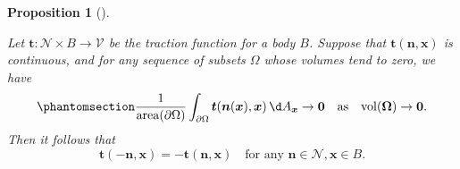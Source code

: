 \documentclass[
  letterpaper,
  DIV=11,
  numbers=noendperiod]{scrreprt}
\theoremstyle{plain}
\newtheorem{proposition}{Proposition}[chapter]
\theoremstyle{remark}
\begin{document}
\begin{proposition}[]\protect\hypertarget{prp-actionreaction}{}\label{prp-actionreaction}

Let \({\boldsymbol{t}}:{\mathcal{N}}\times B\to{\mathcal{V}}\) be the
traction function for a body \(B\). Suppose that
\({\boldsymbol{t}}({\boldsymbol{n}},{\boldsymbol{x}})\) is continuous,
and for any sequence of subsets \(\Omega\) whose volumes tend to zero,
we have \begin{equation}\phantomsection\label{eq-arcondition1}{
\frac{1}{{\operatorname{area}}(\partial\Omega)}\int_{\partial\Omega} {\boldsymbol{t}}({\boldsymbol{n}}({\boldsymbol{x}}),{\boldsymbol{x}}){\,\d A_{{\boldsymbol{x}}}}\to\bf0\quad\text{as}\quad{\operatorname{vol}}(\Omega)\to0.
}\end{equation} Then it follows that
\[{\boldsymbol{t}}(-{\boldsymbol{n}},{\boldsymbol{x}}) = -{\boldsymbol{t}}({\boldsymbol{n}},{\boldsymbol{x}})\quad\text{for any }{\boldsymbol{n}}\in{\mathcal{N}},{\boldsymbol{x}}\in B.\]

\end{proposition}
\end{document}

